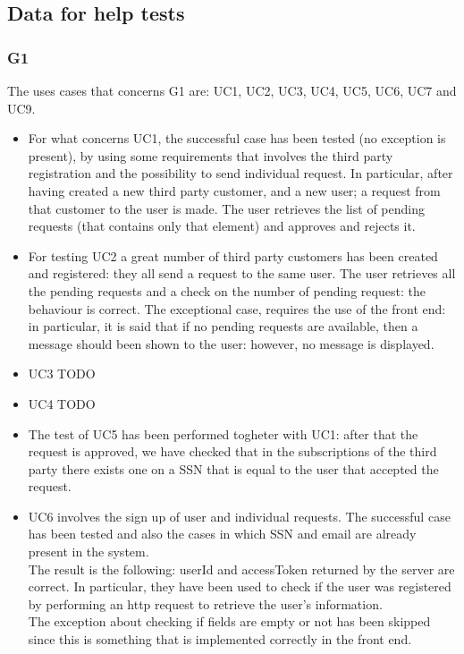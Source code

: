 \subsection{Data for help tests}
\subsubsection{G1}
The uses cases that concerns G1 are: UC1, UC2, UC3, UC4, UC5, UC6, UC7 and UC9.  \\

\begin{itemize}
\item For what concerns UC1, the successful case has been tested (no exception is present), by using some requirements that involves the
third party registration and the possibility to send individual request. In particular, after having created a new third party customer,
and a new user; a request from that customer to the user is made. The user retrieves the list of pending requests (that contains only that
element) and approves and rejects it.

\item For testing UC2 a great number of third party customers has been created and registered: they all send a request to the same user.
The user retrieves all the pending requests and a check on the number of pending request: the behaviour is correct.
The exceptional case, requires the use of the front end: in particular, it is said that if no pending requests are available, then a message
should been shown to the user: however, no message is displayed.

\item UC3 TODO

\item UC4 TODO

\item The test of UC5 has been performed togheter with UC1: after that the request is approved, we have checked that in the subscriptions
of the third party there exists one on a SSN that is equal to the user that accepted the request.

\item UC6 involves the sign up of user and individual requests. The successful case has been tested and also the cases in which SSN and email
are already present in the system. \\
The result is the following: userId and accessToken returned by the server are correct. In particular, they have been used to check
if the user was registered by performing an http request to retrieve the user's information.  \\
The exception about checking if fields are empty or not has been skipped since this is something that is implemented correctly in the front
end.


\end{itemize}
